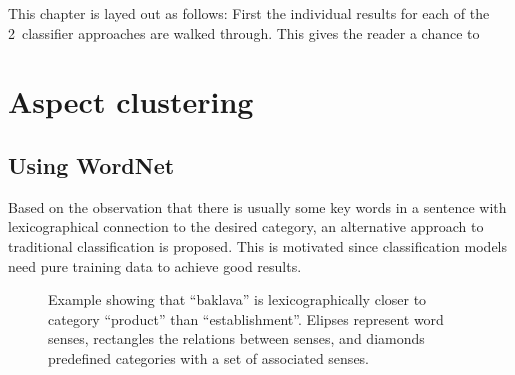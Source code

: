 \documentclass[a4paper,11pt]{kth-mag}
\newcommand{\numClassifierAproaches}{2}
\begin{document}
This chapter is layed out as follows: First the individual results for each of the \numClassifierAproaches~classifier approaches are walked through. This gives the reader a chance to



\section{Aspect clustering}
\subsection{Using WordNet}
Based on the observation that there is usually some key words in a sentence with lexicographical connection to the desired category, an alternative approach to traditional classification is proposed. This is motivated since classification models need pure training data to achieve good results.

\begin{figure}[t]
  \centering
  \caption{Example showing that ``baklava'' is lexicographically closer to category ``product'' than ``establishment''. Elipses represent word senses, rectangles the relations between senses, and diamonds predefined categories with a set of associated senses.}
  \label{fig:baklava_lex}
\end{figure}
\end{document}

